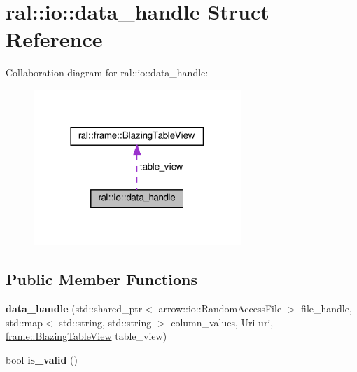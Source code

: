 \hypertarget{structral_1_1io_1_1data__handle}{}\section{ral\+:\+:io\+:\+:data\+\_\+handle Struct Reference}
\label{structral_1_1io_1_1data__handle}


Collaboration diagram for ral\+:\+:io\+:\+:data\+\_\+handle\+:\nopagebreak
\begin{figure}[H]
\begin{center}
\leavevmode
\includegraphics[width=222pt]{structral_1_1io_1_1data__handle__coll__graph}
\end{center}
\end{figure}
\subsection*{Public Member Functions}
\begin{DoxyCompactItemize}
\item 
\mbox{\label{structral_1_1io_1_1data__handle_a602f0da6f910ddac68d51d7655e1a154}} 
{\bfseries data\+\_\+handle} (std\+::shared\+\_\+ptr$<$ arrow\+::io\+::\+Random\+Access\+File $>$ file\+\_\+handle, std\+::map$<$ std\+::string, std\+::string $>$ column\+\_\+values, Uri uri, \hyperlink{classral_1_1frame_1_1BlazingTableView}{frame\+::\+Blazing\+Table\+View} table\+\_\+view)
\item 
\mbox{\label{structral_1_1io_1_1data__handle_a338552cc655ec9fda4c48de786b92472}} 
bool {\bfseries is\+\_\+valid} ()
\end{DoxyCompactItemize}
